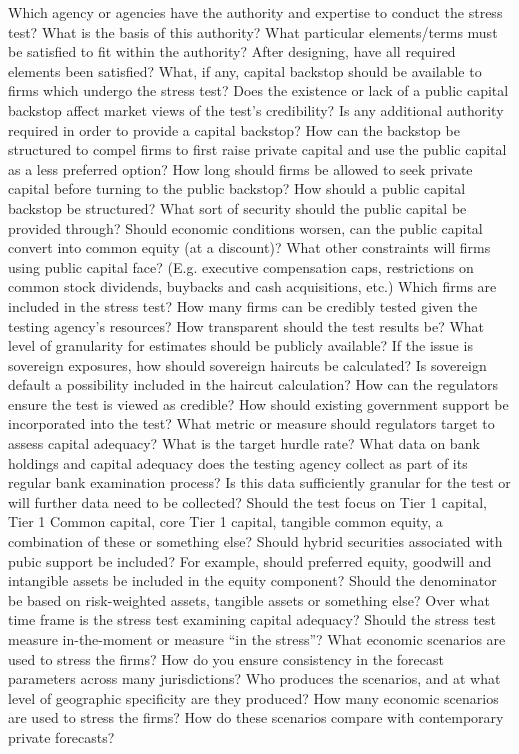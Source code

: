 \documentclass[12pt]{article}
\begin{document}
\begin{outline}[enumerate]

\1 Which agency or agencies have the authority and expertise to conduct the stress test?
\2 What is the basis of this authority?
\2 What particular elements/terms must be satisfied to fit within the authority?
\2 After designing, have all required elements been satisfied?
\1 What, if any, capital backstop should be available to firms which undergo the stress test?
\2 Does the existence or lack of a public capital backstop affect market views of the test's credibility?
\2 Is any additional authority required in order to provide a capital backstop?
\2 How can the backstop be structured to compel firms to first raise private capital and use the public capital as a less preferred option?
\2 How long should firms be allowed to seek private capital before turning to the public backstop?
\1 How should a public capital backstop be structured?
\2 What sort of security should the public capital be provided through?
\2 Should economic conditions worsen, can the public capital convert into common equity (at a discount)?
\2 What other constraints will firms using public capital face? (E.g. executive compensation caps, restrictions on common stock dividends, buybacks and cash acquisitions, etc.)
\1 Which firms are included in the stress test?
\2 How many firms can be credibly tested given the testing agency's resources?
\1 How transparent should the test results be? What level of granularity for estimates should be publicly available?
\2 If the issue is sovereign exposures, how should sovereign haircuts be calculated?
\2 Is sovereign default a possibility included in the haircut calculation?
\1 How can the regulators ensure the test is viewed as credible?
\2 How should existing government support be incorporated into the test?
\2 What metric or measure should regulators target to assess capital adequacy?
\3 What is the target hurdle rate?
\3 What data on bank holdings and capital adequacy does the testing agency collect as part of its regular bank examination process? Is this data sufficiently granular for the test or will further data need to be collected?
\3 Should the test focus on Tier 1 capital, Tier 1 Common capital, core Tier 1 capital, tangible common equity, a combination of these or something else?
\4 Should hybrid securities associated with pubic support be included?
\4 For example, should preferred equity, goodwill and intangible assets be included in the equity component?
\4 Should the denominator be based on risk-weighted assets, tangible assets or something else?
\1 Over what time frame is the stress test examining capital adequacy?
\2 Should the stress test measure in-the-moment or measure ``in the stress''?
\1 What economic scenarios are used to stress the firms?
\2 How do you ensure consistency in the forecast parameters across many jurisdictions?
\2 Who produces the scenarios, and at what level of geographic specificity are they produced?
\2 How many economic scenarios are used to stress the firms?
\2 How do these scenarios compare with contemporary private forecasts?

\end{outline}
\end{document}
